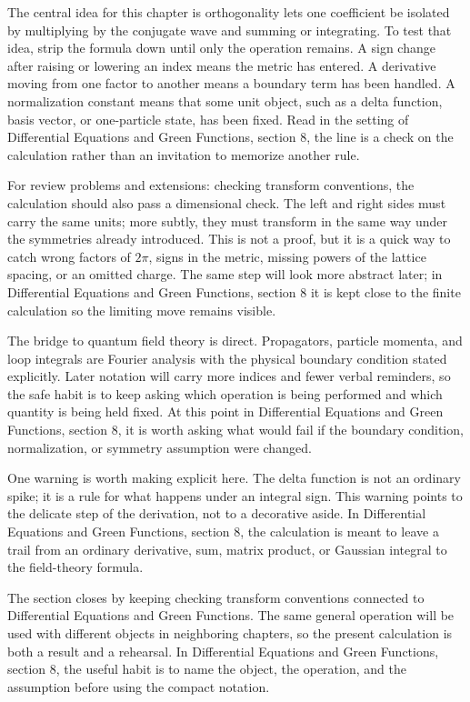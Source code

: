 The central idea for this chapter is orthogonality lets one coefficient be isolated by multiplying by the conjugate wave and summing or integrating.  To test that idea, strip the formula down until only the operation remains.  A sign change after raising or lowering an index means the metric has entered.  A derivative moving from one factor to another means a boundary term has been handled.  A normalization constant means that some unit object, such as a delta function, basis vector, or one-particle state, has been fixed.  Read in the setting of Differential Equations and Green Functions, section 8, the line is a check on the calculation rather than an invitation to memorize another rule.

For review problems and extensions: checking transform conventions, the calculation should also pass a dimensional check.  The left and right sides must carry the same units; more subtly, they must transform in the same way under the symmetries already introduced.  This is not a proof, but it is a quick way to catch wrong factors of \(2\pi\), signs in the metric, missing powers of the lattice spacing, or an omitted charge.  The same step will look more abstract later; in Differential Equations and Green Functions, section 8 it is kept close to the finite calculation so the limiting move remains visible.

The bridge to quantum field theory is direct.  Propagators, particle momenta, and loop integrals are Fourier analysis with the physical boundary condition stated explicitly.  Later notation will carry more indices and fewer verbal reminders, so the safe habit is to keep asking which operation is being performed and which quantity is being held fixed.  At this point in Differential Equations and Green Functions, section 8, it is worth asking what would fail if the boundary condition, normalization, or symmetry assumption were changed.

One warning is worth making explicit here.  The delta function is not an ordinary spike; it is a rule for what happens under an integral sign.  This warning points to the delicate step of the derivation, not to a decorative aside.  In Differential Equations and Green Functions, section 8, the calculation is meant to leave a trail from an ordinary derivative, sum, matrix product, or Gaussian integral to the field-theory formula.

The section closes by keeping checking transform conventions connected to Differential Equations and Green Functions.  The same general operation will be used with different objects in neighboring chapters, so the present calculation is both a result and a rehearsal.  In Differential Equations and Green Functions, section 8, the useful habit is to name the object, the operation, and the assumption before using the compact notation.



